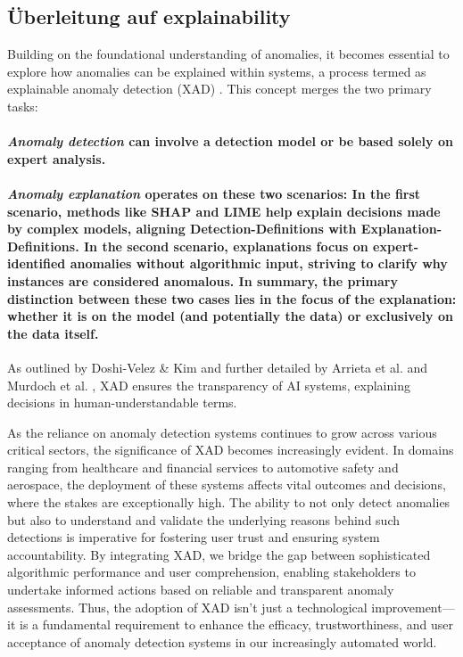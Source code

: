 \subsection{Überleitung auf explainability}
Building on the foundational understanding of anomalies, it becomes essential to explore how anomalies can be explained within systems, a process termed as explainable anomaly detection (XAD) \cite{Li2023}. This concept merges the two primary tasks:
\paragraph{\textit{Anomaly detection} can involve a detection model  or be based solely on expert analysis.}
\paragraph{\textit{Anomaly explanation} operates on these two scenarios: In the first scenario, methods like SHAP \cite{Lundberg2017} and LIME \cite{Ribeiro2016} help explain decisions made by complex models, aligning Detection-Definitions with Explanation-Definitions. In the second scenario, explanations focus on expert-identified anomalies without algorithmic input, striving to clarify why instances are considered anomalous. In summary, the primary distinction between these two cases lies in the focus of the explanation: whether it is on the model (and potentially the data) or exclusively on the data itself.}

As outlined by Doshi-Velez \& Kim \cite{DoshiVelez2017} and further detailed by Arrieta et al. \cite{BarredoArrieta2020} and Murdoch et al. \cite{Murdoch2019}, XAD ensures the transparency of AI systems, explaining decisions in human-understandable terms. 





As the reliance on anomaly detection systems continues to grow across various critical sectors, the significance of XAD becomes increasingly evident. In domains ranging from healthcare and financial services to automotive safety and aerospace, the deployment of these systems affects vital outcomes and decisions, where the stakes are exceptionally high. The ability to not only detect anomalies but also to understand and validate the underlying reasons behind such detections is imperative for fostering user trust and ensuring system accountability. By integrating XAD, we bridge the gap between sophisticated algorithmic performance and user comprehension, enabling stakeholders to undertake informed actions based on reliable and transparent anomaly assessments. Thus, the adoption of XAD isn't just a technological improvement—it is a fundamental requirement to enhance the efficacy, trustworthiness, and user acceptance of anomaly detection systems in our increasingly automated world.



